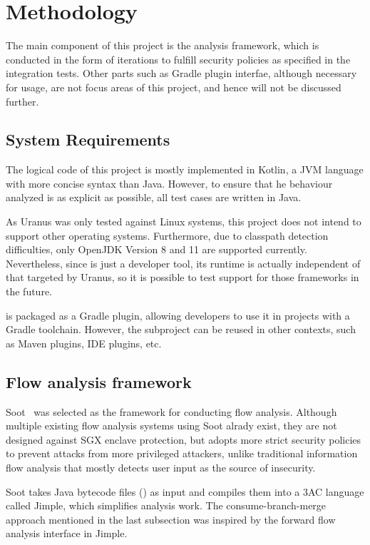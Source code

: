 \section{Methodology}\label{sec:methodology}
The main component of this project is the analysis framework,
which is conducted in the form of iterations
to fulfill security policies as specified in the integration tests.
Other parts such as Gradle plugin interfae,
although necessary for usage,
are not focus areas of this project, and hence will not be discussed further.



\subsection{System Requirements}\label{subsec:system-requirements}
The logical code of this project is mostly implemented in Kotlin,
a JVM language with more concise syntax than Java.
However, to ensure that he behaviour analyzed
is as explicit as possible,
all test cases are written in Java.

As Uranus was only tested against Linux systems,
this project does not intend to support other operating systems.
Furthermore, due to classpath detection difficulties,
only OpenJDK Version 8 and 11 are supported currently.
Nevertheless, since \pname{} is just a developer tool,
its runtime is actually independent of that targeted by Uranus,
so it is possible to test support for those frameworks in the future.

\pname{} is packaged as a Gradle plugin,
allowing developers to use it in projects with a Gradle toolchain.
However, the  subproject can be reused in other contexts,
such as Maven plugins, IDE plugins, etc.

\subsection{Flow analysis framework}\label{subsec:flow-analysis-framework}
Soot~\cite{sootsurvivor} was selected as the framework for conducting flow analysis.
Although multiple existing flow analysis systems using Soot alrady exist,
they are not designed against SGX enclave protection,
but \pname{} adopts more strict security policies
to prevent attacks from more privileged attackers,
unlike traditional information flow analysis
that mostly detects user input as the source of insecurity.

Soot takes Java bytecode files () as input
and compiles them into a 3AC language called Jimple,
which simplifies analysis work.
The consume-branch-merge approach mentioned in the last subsection
was inspired by the forward flow analysis interface in Jimple.

